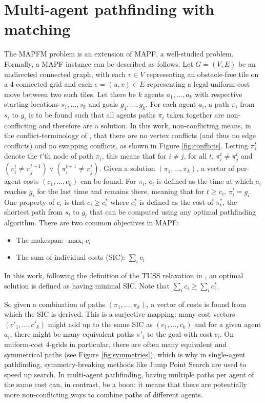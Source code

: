 \documentclass[english]{article}
\begin{document}
	\section{Multi-agent pathfinding with matching} %
	The MAPFM problem is an extension of MAPF, a well-studied problem. Formally, a MAPF instance can be described as follows. Let $G = (V,E)$ be an undirected connected graph, with each $v\in V$ representing an obstacle-free tile on a 4-connected grid and each $e = (u,v)\in E$ representing a legal uniform-cost move between two such tiles. Let there be $k$ agents $a_1,\ldots,a_k$ with respective starting locations $s_1,\ldots,s_k$ and goals $g_1,\ldots,g_k$. For each agent $a_i$, a path $\pi_i$ from $s_i$ to $g_i$ is to be found such that all agents paths $\pi_i$ taken together are non-conflicting and therefore are a solution. In this work, non-conflicting means, in the conflict-terminology of \cite{stern2019}, that there are no vertex conflicts (and thus no edge conflicts) and no swapping conflicts, as shown in Figure \ref{fig:conflicts}. Letting $\pi_i^t$ denote the $t$'th node of path $\pi_i$, this means that for $i\neq j$, for all $t$, $\pi_i^t\neq \pi_j^t$ and $(\pi_i^t \neq \pi_j^{t + 1})\lor(\pi_i^{t+1} \neq \pi_j^t)$. Given a solution $(\pi_1,\ldots,\pi_k)$, a vector of per-agent costs $(c_1,\ldots,c_k)$ can be found. For $\pi_i$, $c_i$ is defined as the time at which $a_i$ reaches $g_i$ for the last time and remains there, meaning that for $t \geq c_i$, $\pi_i^{t} = g_i$. One property of $c_i$ is that $c_i \geq c^*_i$ where $c^*_i$ is defined as the cost of $\pi^*_i$, the shortest path from $s_i$ to $g_i$ that can be computed using any optimal pathfinding algorithm. There are two common objectives in MAPF:
	\begin{itemize}
		\item The makespan: $\max_{i} c_i$
		\item The sum of individual costs (SIC): $\sum_i c_i$
	\end{itemize}
	In this work, following the definition of the TUSS relaxation in \cite{mulderij2020}, an optimal solution is defined as having minimal SIC. Note that $\sum_i c_i \geq \sum_i c^*_i$.
	
	So given a combination of paths $(\pi_1,\ldots,\pi_k)$, a vector of costs is found from which the SIC is derived. This is a surjective mapping: many cost vectors $(c'_1,\ldots,c'_k)$ might add up to the same SIC as $(c_1,\ldots,c_k)$ and for a given agent $a_i$, there might be many equivalent paths $\pi'_i$ to the goal with cost $c_i$. On uniform-cost 4-grids in particular, there are often many equivalent and symmetrical paths\cite{harabor2010} (see Figure \ref{fig:symmetries}), which is why in single-agent pathfinding, symmetry-breaking methods like Jump Point Search\cite{harabor2011} are used to speed up search. In multi-agent pathfinding, having multiple paths per agent of the same cost can, in contrast, be a boon: it means that there are potentially more non-conflicting ways to combine paths of different agents.
\end{document}
